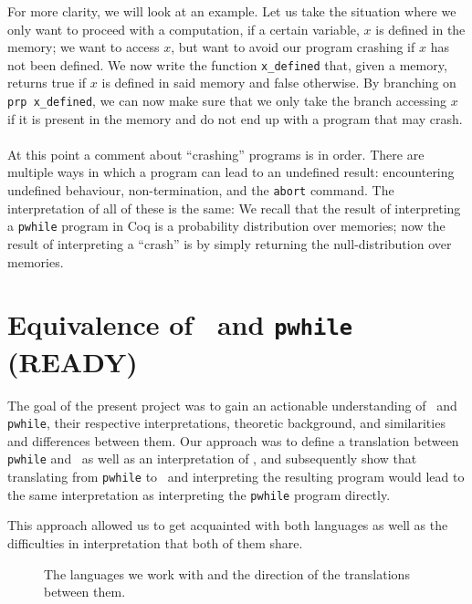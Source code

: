 \documentclass[11pt, leqno, titlepage]{article}
\theoremstyle{definition}
\begin{document}
For more clarity, we will look at an example. Let us take the situation where we only
want to proceed with a computation, if a certain variable, $x$ is defined in the
memory; we want to access $x$, but want to avoid our program crashing if $x$ has not
been defined. We now write the function \texttt{x\_defined} that, given a memory,
returns true if $x$ is defined in said memory and false otherwise. By branching on
\texttt{prp x\_defined}, we can now make sure that we only take the branch accessing
$x$ if it is present in the memory and do not end up with a program that may
crash. \\
\\
At this point a comment about ``crashing'' programs is in order. There are multiple
ways in which a program can lead to an undefined result: encountering undefined
behaviour, non-termination, and the \texttt{abort} command. The interpretation of all
of these is the same: We recall that the result of interpreting a \texttt{pwhile}
program in Coq is a probability distribution over memories; now the result of
interpreting a ``crash'' is by simply returning the null-distribution over memories.


\section{Equivalence of \rml\ and \texttt{pwhile} (READY)}\label{sec:approach}



The goal of the present project was to gain an actionable understanding of \rml\ and
\texttt{pwhile}, their respective interpretations, theoretic background, and
similarities and differences between them. Our approach was to define a translation
between \texttt{pwhile} and \rml\ as well as an interpretation of \rml, and
subsequently show that translating from \texttt{pwhile} to \rml\ and interpreting the
resulting program would lead to the same interpretation as interpreting the
\texttt{pwhile} program directly.

This approach allowed us to get acquainted with both languages as well as the
difficulties in interpretation that both of them share.

\begin{figure}[h]
  \centering
  \caption{The languages we work with and the direction of the translations between
    them. }
  \label{fig:triangle}
\end{figure}
\end{document}
